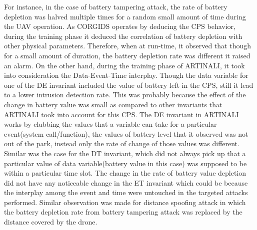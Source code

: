 For instance, in the case of battery tampering attack, the rate of battery depletion was halved multiple times for a random small amount of time during the UAV operation. As CORGIDS operates by deducing the CPS behavior, during the training phase it deduced the correlation of battery depletion with other physical parameters. Therefore, when at run-time, it observed that though for a small amount of duration, the battery depletion rate was different it raised an alarm. On the other hand, during the training phase of ARTINALI, it took into consideration the Data-Event-Time interplay. Though the data variable for one of the D\textbar E invariant included the value of battery left in the CPS, still it lead to a lower intrusion detection rate. This was probably because the effect of the change in battery value was small as compared to other invariants that ARTINALI took into account for this CPS. The D\textbar E invariant in ARTINALI works by clubbing the values that a variable can take for a particular event(system call/function), the values of battery level that it observed was not out of the park, instead only the rate of change of those values was different. Similar was the case for the D\textbar T invariant, which did not always pick up that a particular value of data variable(battery value in this case) was supposed to be within a particular time slot. The change in the rate of battery value depletion did not have any noticeable change in the E\textbar T invariant which could be because the interplay among the event and time were untouched in the targeted attacks performed. Similar observation was made for distance spoofing attack in which the battery depletion rate from battery tampering attack was replaced by the distance covered by the drone.

